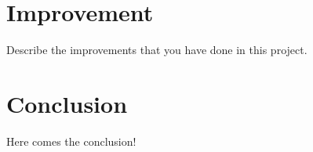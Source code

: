\documentclass[12pt,a4paper]{report}
\begin{document}
 






\chapter{Improvement}
Describe the improvements that you have done in this project.

\chapter{Conclusion}
Here comes the conclusion!

%
%





\begin{appendices}


\end{appendices}
\end{document}
